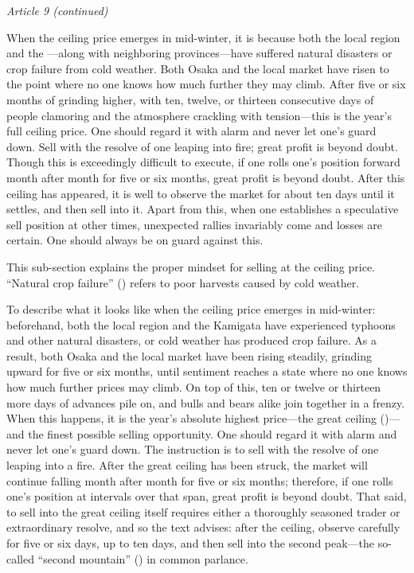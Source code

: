 \begin{sokyubox}
{\small\itshape\color{sokyubar} Article 9 (continued)}

\medskip
When the ceiling price emerges in mid-winter, it is because both the
local region and the ---along with neighboring
provinces---have suffered natural disasters or crop failure from cold
weather. Both Osaka and the local market have risen to the point where
no one knows how much further they may climb. After five or six months
of grinding higher, with ten, twelve, or thirteen consecutive days of
people clamoring and the atmosphere crackling with tension---this is the
year's full ceiling price. One should regard it with alarm and never let
one's guard down. Sell with the resolve of one leaping into fire; great
profit is beyond doubt. Though this is exceedingly difficult to execute,
if one rolls one's position forward month after month for five or six
months, great profit is beyond doubt. After this ceiling has appeared, it
is well to observe the market for about ten days until it settles, and
then sell into it. Apart from this, when one establishes a speculative
sell position at other times, unexpected rallies invariably come and
losses are certain. One should always be on guard against this.
\end{sokyubox}

\commentary
This sub-section explains the proper mindset for selling at the ceiling
price. ``Natural crop failure'' () refers to poor
harvests caused by cold weather.

To describe what it looks like when the ceiling price emerges in
mid-winter: beforehand, both the local region and the Kamigata have
experienced typhoons and other natural disasters, or cold weather has
produced crop failure. As a result, both Osaka and the local market have
been rising steadily, grinding upward for five or six months, until
sentiment reaches a state where no one knows how much further prices may
climb. On top of this, ten or twelve or thirteen more days of advances
pile on, and bulls and bears alike join together in a frenzy. When this
happens, it is the year's absolute highest price---the great ceiling
()---and the finest possible selling
opportunity. One should regard it with alarm and never let one's guard
down. The instruction is to sell with the resolve of one leaping into a
fire. After the great ceiling has been struck, the market will continue
falling month after month for five or six months; therefore, if one
rolls one's position at intervals over that span, great profit is beyond
doubt. That said, to sell into the great ceiling itself requires either a
thoroughly seasoned trader or extraordinary resolve, and so the text
advises: after the ceiling, observe carefully for five or six days, up to
ten days, and then sell into the second peak---the so-called ``second
mountain'' () in common parlance.

